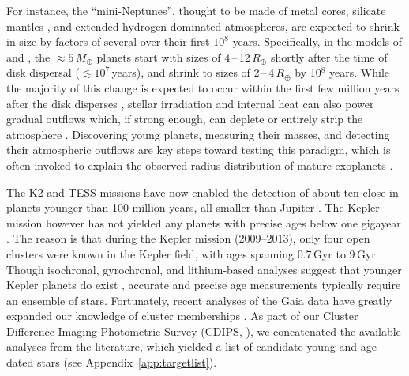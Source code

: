 \documentclass[12pt,modern,twocolumn,tighten]{aastex63}
\begin{document}
For instance, the ``mini-Neptunes'', thought to be made of metal
cores, silicate mantles \citep{kite_atmosphere_2020}, and extended
hydrogen-dominated atmospheres, are expected to shrink
in size by factors of several over their first $10^8$ years.
Specifically, in the models of \citet{owen_atmospheres_2016} and
\citet{owen_constraining_2020}, the $\approx$$5\,M_\oplus$ planets start
with sizes of 4\,--\,12\,$R_\oplus$ shortly after the time of disk
dispersal ($\lesssim$$10^7$\,years), and shrink to sizes of
2\,--\,4\,$R_\oplus$ by 10$^8$ years.  While the majority of this change
is expected to occur within the first few million years after the disk
disperses \citep{ikoma_situ_2012}, stellar
irradiation and internal heat can also power gradual outflows
which, if strong enough, can deplete or entirely strip the atmosphere \citep{lopez_how_2012,Owen_Wu_2013,ginzburg_corepowered_2018}. Discovering young planets, measuring their masses, and detecting their
atmospheric outflows are key steps toward testing this paradigm, which
is often invoked to explain the observed radius distribution of mature
exoplanets \citep{Fulton_et_al_2017,van_eylen_asteroseismic_2018}.

The K2 and TESS missions have now enabled the detection of about ten
close-in planets younger than 100 million years, all smaller than
Jupiter
\citep{Mann_K2_33b_2016,David_et_al_2017,david_four_2019,newton_tess_2019,bouma_cluster_2020,plavchan_planet_2020,rizzuto_tess_2020,martioli_aumicbc_2021}.
The Kepler mission however has not yielded any planets with precise
ages below one gigayear \citep{Meibom_et_al_2013}.  The reason is that
during the  Kepler mission (2009--2013), only four open clusters
were known in the Kepler field,
with ages spanning 0.7\,Gyr to 9\,Gyr \citep{meibom_kepler_2011}.
Though isochronal, gyrochronal, and lithium-based analyses suggest
that younger Kepler planets do exist
\citep{walkowicz_rotation_2013,berger_identifying_2018,david_sizes_2021}, accurate and precise
age measurements typically require an ensemble of stars.  Fortunately,
recent analyses of the Gaia data have greatly expanded our knowledge
of cluster memberships \citep[{\it
e.g.},][]{CantatGaudin2018a,Zari2018,KounkelCovey2019,Meingast2021,Kerr2021}.
As part of our Cluster Difference Imaging Photometric Survey (CDIPS,
\citealt{bouma_cdipsI_2019}), we concatenated the available analyses
from the literature, which yielded a list of candidate young and
age-dated stars (see Appendix~\ref{app:targetlist}).
\end{document}
